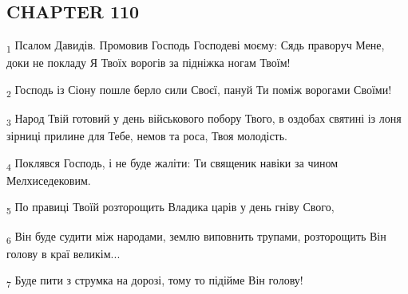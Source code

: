 \subsection{CHAPTER 110}
\begin{tcolorbox}
\textsubscript{1} Псалом Давидів. Промовив Господь Господеві моєму: Сядь праворуч Мене, доки не покладу Я Твоїх ворогів за підніжка ногам Твоїм!
\end{tcolorbox}
\begin{tcolorbox}
\textsubscript{2} Господь із Сіону пошле берло сили Своєї, пануй Ти поміж ворогами Своїми!
\end{tcolorbox}
\begin{tcolorbox}
\textsubscript{3} Народ Твій готовий у день військового побору Твого, в оздобах святині із лоня зірниці прилине для Тебе, немов та роса, Твоя молодість.
\end{tcolorbox}
\begin{tcolorbox}
\textsubscript{4} Поклявся Господь, і не буде жаліти: Ти священик навіки за чином Мелхиседековим.
\end{tcolorbox}
\begin{tcolorbox}
\textsubscript{5} По правиці Твоїй розторощить Владика царів у день гніву Свого,
\end{tcolorbox}
\begin{tcolorbox}
\textsubscript{6} Він буде судити між народами, землю виповнить трупами, розторощить Він голову в краї великім...
\end{tcolorbox}
\begin{tcolorbox}
\textsubscript{7} Буде пити з струмка на дорозі, тому то підійме Він голову!
\end{tcolorbox}
